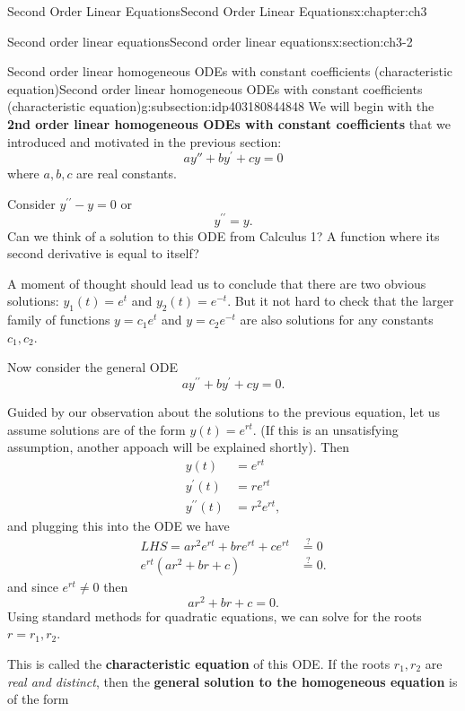 \documentclass[oneside,10pt,]{book}
\newcommand{\terminology}[1]{\textbf{#1}}
\numberwithin{equation}{section}
\numberwithin{equation}{section}
\newcommand{\amp}{&}
\begin{document}
\begin{chapterptx}{Second Order Linear Equations}{}{Second Order Linear Equations}{}{}{x:chapter:ch3}
\begin{sectionptx}{Second order linear equations}{}{Second order linear equations}{}{}{x:section:ch3-2}
\begin{subsectionptx}{Second order linear homogeneous ODEs with constant coefficients (characteristic equation)}{}{Second order linear homogeneous ODEs with constant coefficients (characteristic equation)}{}{}{g:subsection:idp403180844848}
We will begin with the \terminology{2nd order linear homogeneous ODEs with constant coefficients} that we introduced and motivated in the previous section:%
\begin{equation*}
ay''+by^{\prime}+cy=0
\end{equation*}
where \(a,b,c\) are real constants.%
\par
Consider \(y^{\prime\prime}-y=0\) or%
\begin{equation*}
y^{\prime\prime}=y.
\end{equation*}
Can we think of a solution to this ODE from Calculus 1? A function where its second derivative is equal to itself?%
\par
A moment of thought should lead us to conclude that there are two obvious solutions: \(y_{1}(t)=e^{t}\) and \(y_{2}(t)=e^{-t}\). But it not hard to check that the larger family of functions \(y = c_{1}e^{t}\) and \(y = c_{2}e^{-t}\) are also solutions for any constants \(c_1, c_2\).%
\par
Now consider the general ODE%
\begin{equation*}
ay^{\prime\prime}+by^{\prime}+cy=0.
\end{equation*}
%
\par
Guided by our observation about the solutions to the previous equation, let us assume solutions are of the form \(y(t)=e^{rt}\). (If this is an unsatisfying assumption, another appoach will be explained shortly).  Then%
\begin{align*}
y(t) \amp =e^{rt}\\
y^{\prime}(t) \amp =re^{rt}\\
y^{\prime\prime}(t) \amp =r^{2}e^{rt},
\end{align*}
and plugging this into the ODE we have%
\begin{align*}
LHS=ar^{2}e^{rt}+bre^{rt}+ce^{rt} \amp \overset{?}{=}0\\
e^{rt}\left(ar^{2}+br+c\right) \amp \overset{?}{=}0.
\end{align*}
and since \(e^{rt}\neq0\) then%
\begin{equation*}
ar^{2}+br+c=0.
\end{equation*}
Using standard methods for quadratic equations, we can solve for the roots \(r=r_{1},r_{2}\).%
\par
This is called the \terminology{characteristic equation} of this ODE. If the roots \(r_1, r_2\) are \emph{real and distinct}, then the \terminology{general solution to the homogeneous equation} is of the form%
\begin{equation*}

\end{equation*}
\end{subsectionptx}
\end{sectionptx}
\end{chapterptx}
\end{document}

